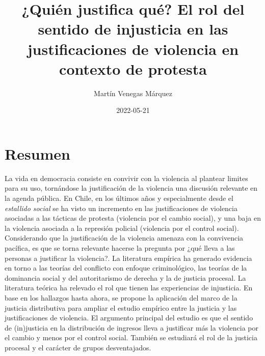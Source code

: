 \documentclass[12pt,twoside]{templates/facsothesis}
\title{¿Quién justifica qué? El rol del sentido de injusticia en las justificaciones de violencia en contexto de protesta}
\author{Martín Venegas Márquez}
\date{2022-05-21}
\begin{document}

  \maketitle

\frontmatter %
\pagestyle{empty} %



  \setcounter{tocdepth}{1}
  \setlength{\parskip}{0pt}
  \tableofcontents

\setlength\parskip{1em plus 0.1em minus 0.2em}

  \listoftables

  \listoffigures



\mainmatter %
\pagestyle{fancyplain} %

\hypertarget{resumen}{%
\chapter*{Resumen}\label{resumen}}

La vida en democracia consiste en convivir con la violencia al plantear limites para su uso, tornándose la justificación de la violencia una discusión relevante en la agenda pública. En Chile, en los últimos años y especialmente desde el \emph{estallido social} se ha visto un incremento en las justificaciones de violencia asociadas a las tácticas de protesta (violencia por el cambio social), y una baja en la violencia asociada a la represión policial (violencia por el control social). Considerando que la justificación de la violencia amenaza con la convivencia pacífica, es que se torna relevante hacerse la pregunta por ¿qué lleva a las personas a justificar la violencia?. La literatura empírica ha generado evidencia en torno a las teorías del conflicto con enfoque criminológico, las teorías de la dominancia social y del autoritarismo de derecha y la de justicia procesal. La literatura teórica ha relevado el rol que tienen las experiencias de injusticia. En base en los hallazgos hasta ahora, se propone la aplicación del marco de la justicia distributiva para ampliar el estudio empírico entre la justicia y las justificaciones de violencia. El argumento principal del estudio es que el sentido de (in)justicia en la distribución de ingresos lleva a justificar más la violencia por el cambio y menos por el control social. También se estudiará el rol de la justicia procesal y el carácter de grupos desventajados.
\end{document}
